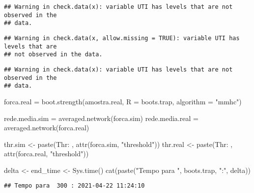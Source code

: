 \documentclass[
]{article}
\newenvironment{Shaded}{\begin{snugshade}}{\end{snugshade}}
\newcommand{\AttributeTok}[1]{\textcolor[rgb]{0.77,0.63,0.00}{#1}}
\newcommand{\FunctionTok}[1]{\textcolor[rgb]{0.00,0.00,0.00}{#1}}
\newcommand{\NormalTok}[1]{#1}
\newcommand{\OtherTok}[1]{\textcolor[rgb]{0.56,0.35,0.01}{#1}}
\newcommand{\StringTok}[1]{\textcolor[rgb]{0.31,0.60,0.02}{#1}}
\begin{document}
\begin{verbatim}
## Warning in check.data(x): variable UTI has levels that are not observed in the
## data.
\end{verbatim}

\begin{verbatim}
## Warning in check.data(x, allow.missing = TRUE): variable UTI has levels that are
## not observed in the data.
\end{verbatim}

\begin{verbatim}
## Warning in check.data(x): variable UTI has levels that are not observed in the
## data.
\end{verbatim}

\begin{Shaded}
\begin{Highlighting}[]
\NormalTok{forca.real }\OtherTok{=} \FunctionTok{boot.strength}\NormalTok{(amostra.real, }
                         \AttributeTok{R =}\NormalTok{ boots.trap, }
                         \AttributeTok{algorithm =} \StringTok{"mmhc"}\NormalTok{)}

\NormalTok{rede.media.sim }\OtherTok{=} \FunctionTok{averaged.network}\NormalTok{(forca.sim)}
\NormalTok{rede.media.real }\OtherTok{=} \FunctionTok{averaged.network}\NormalTok{(forca.real)}

\NormalTok{thr.sim }\OtherTok{\textless{}{-}} \FunctionTok{paste}\NormalTok{(}\StringTok{\textquotesingle{}Thr: \textquotesingle{}}\NormalTok{, }\FunctionTok{attr}\NormalTok{(forca.sim, }\StringTok{"threshold"}\NormalTok{))}
\NormalTok{thr.real }\OtherTok{\textless{}{-}} \FunctionTok{paste}\NormalTok{(}\StringTok{\textquotesingle{}Thr: \textquotesingle{}}\NormalTok{, }\FunctionTok{attr}\NormalTok{(forca.real, }\StringTok{"threshold"}\NormalTok{))}

\NormalTok{delta }\OtherTok{\textless{}{-}}\NormalTok{ end\_time }\OtherTok{\textless{}{-}} \FunctionTok{Sys.time}\NormalTok{()}
\FunctionTok{cat}\NormalTok{(}\FunctionTok{paste}\NormalTok{(}\StringTok{"Tempo para "}\NormalTok{, boots.trap, }\StringTok{":"}\NormalTok{, delta))}
\end{Highlighting}
\end{Shaded}

\begin{verbatim}
## Tempo para  300 : 2021-04-22 11:24:10
\end{verbatim}
\end{document}
